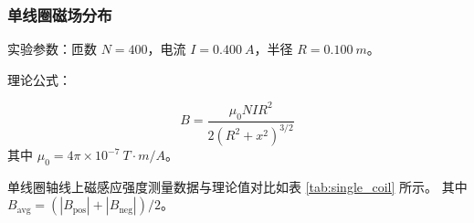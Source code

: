 \documentclass{../../templates/Report}%
\begin{document}
\begin{fullreportonly}
    \subsubsection{单线圈磁场分布}

    实验参数：匝数 $N=400$，电流 $I=\SI{0.400}{A}$，半径 $R=\SI{0.100}{m}$。

    理论公式：

    \begin{equation*}
        B = \frac{\mu_0 N I R^2}{2(R^2 + x^2)^{3/2}}
    \end{equation*}
    其中 $\mu_0 = 4\pi \times 10^{-7} \ \si{T\cdot m/A}$。

    单线圈轴线上磁感应强度测量数据与理论值对比如表 \ref{tab:single_coil} 所示。
    其中 $B_{\text{avg}} = (|B_{\text{pos}}| + |B_{\text{neg}}|)/2$。


\end{fullreportonly}
\end{document}
